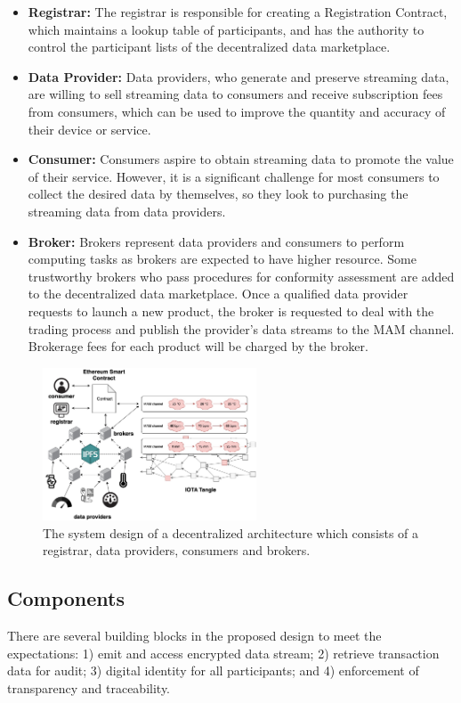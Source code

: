 \documentclass[conference]{IEEEtran}
\begin{document}
\begin{itemize}
\item \textbf{Registrar: }
The registrar is responsible for creating a Registration Contract, which maintains a lookup table of participants, and has the authority to control the participant lists of the decentralized data marketplace.
\item \textbf{Data Provider: }
Data providers, who generate and preserve streaming data, are willing to sell streaming data to consumers and receive subscription fees from consumers, which can be used to improve the quantity and accuracy of their device or service.
\item \textbf{Consumer: }
Consumers aspire to obtain streaming data to promote the value of their service. However, it is a significant challenge for most consumers to collect the desired data by themselves, so they look to purchasing the streaming data from data providers.
\item \textbf{Broker: }
Brokers represent data providers and consumers to perform computing tasks as brokers are expected to have higher resource. Some trustworthy brokers who pass procedures for conformity assessment are added to the decentralized data marketplace. Once a qualified data provider requests to launch a new product, the broker is requested to deal with the trading process and publish the provider’s data streams to the MAM channel. Brokerage fees for each product will be charged by the broker.
\end{itemize}

\begin{figure}[!t]
    \centering
    \includegraphics[width=2.5in]{system_design}
    \caption{The system design of a decentralized architecture which consists of a registrar, data providers, consumers and brokers.}
    \label{fig:system_design}
\end{figure}

\subsection{Components}
There are several building blocks in the proposed design to meet the expectations: 1) emit and access encrypted data stream; 2) retrieve transaction data for audit; 3) digital identity for all participants; and 4) enforcement of transparency and traceability.
\end{document}
